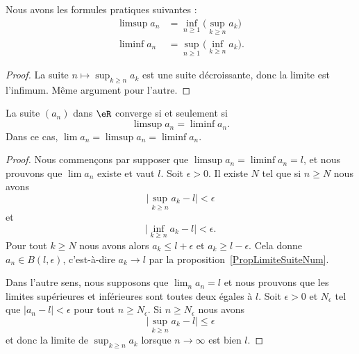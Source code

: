 \begin{lemma}     \label{ooAQTEooYDBovS}
    Nous avons les formules pratiques suivantes :
    \begin{subequations}
        \begin{align}
            \limsup a_n&=\inf_{n\geq 1}\big( \sup_{k\geq n}a_k \big)\\
            \liminf a_n&=\sup_{n\geq 1}\big( \inf_{k\geq n}a_k \big).
        \end{align}
    \end{subequations}
\end{lemma}

\begin{proof}
    La suite \( n\mapsto \sup_{k\geq n}a_k\) est une suite décroissante, donc la limite est l'infimum. Même argument pour l'autre.
\end{proof}

\begin{lemma}       \label{ooIQIKooXWwAmM}
    La suite \( (a_n)\) dans \( \eR\) converge si et seulement si
    \begin{equation}
        \limsup a_n=\liminf a_n.
    \end{equation}
    Dans ce cas, \( \lim a_n=\limsup a_n=\liminf a_n\).
\end{lemma}

\begin{proof}
    Nous commençons par supposer que \( \limsup a_n=\liminf a_n=l\), et nous prouvons que \( \lim a_n\) existe et vaut \( l\). Soit \( \epsilon>0\). Il existe \( N\) tel que si \( n\geq N\) nous avons
    \begin{equation}
        \big| \sup_{k\geq n}a_k-l \big|<\epsilon
    \end{equation}
    et
    \begin{equation}
        \big| \inf_{k\geq n}a_k-l \big|<\epsilon.
    \end{equation}
    Pour tout \( k\geq N\) nous avons alors \( a_k\leq l+\epsilon\) et \( a_k\geq l-\epsilon\). Cela donne \( a_n\in B(l,\epsilon)\), c'est-à-dire \( a_k\to l\) par la proposition~\ref{PropLimiteSuiteNum}.

    Dans l'autre sens, nous supposons que \( \lim_n a_n=l\) et nous prouvons que les limites supérieures et inférieures sont toutes deux égales à \( l\). Soit \( \epsilon>0\) et \( N_{\epsilon}\) tel que \( | a_n-l |<\epsilon\) pour tout \( n\geq N_{\epsilon}\). Si \( n\geq N_{\epsilon}\) nous avons
    \begin{equation}
        \big| \sup_{k\geq n}a_k-l \big|\leq \epsilon
    \end{equation}
    et donc la limite de \( \sup_{k\geq n}a_k\) lorsque \( n\to \infty\) est bien \(l\).
\end{proof}

